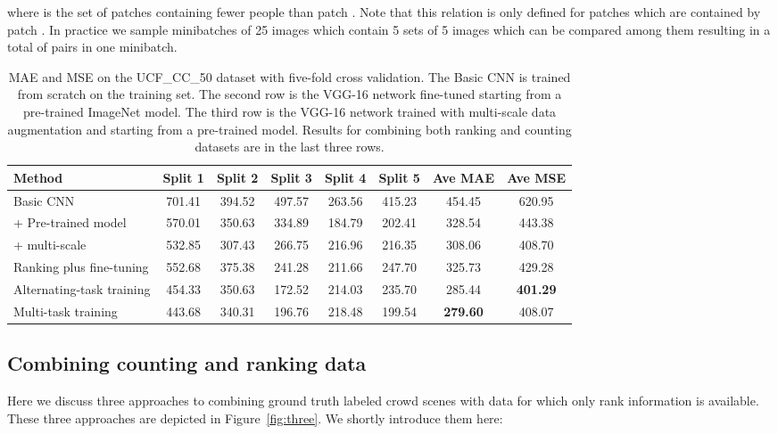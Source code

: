 \documentclass[10pt,twocolumn,letterpaper]{article}
\begin{document}
where  is the set of patches containing fewer people than patch . Note that this relation is only defined for patches which are contained by patch . In practice we sample minibatches of 25 images which contain 5 sets of 5 images which can be compared among them resulting in a total of  pairs in one minibatch.

\begin{table*}
\centering
\begin{tabular}{lccccc|c|c}
\hline
\textbf{Method}          & \textbf{Split 1} & \textbf{Split 2} & \textbf{Split 3} & \textbf{Split 4} & \textbf{Split 5} & \textbf{Ave MAE}  & \textbf{Ave MSE}      \\ \hline \hline
Basic CNN       & 701.41 & 394.52 & 497.57 & 263.56 & 415.23 & 454.45 & 620.95  \\
\: + Pre-trained model       & 570.01 & 350.63 & 334.89 & 184.79 & 202.41 & 328.54 & 443.38  \\
\: + multi-scale       & 532.85 & 307.43 & 266.75 & 216.96 & 216.35 & 308.06 & 408.70 \\
 Ranking plus fine-tuning       & 552.68 & 375.38 &  241.28 & 211.66 & 247.70 & 325.73 &429.28 \\
 Alternating-task training & 454.33 & 350.63 & 172.52 & 214.03 &235.70&  285.44 &\textbf{401.29} \\
 Multi-task training & 443.68 & 340.31 & 196.76 & 218.48 & 199.54 & \textbf{279.60 }  &408.07 \\ \hline

\end{tabular}
\caption{MAE and MSE on the UCF\_CC\_50 dataset with five-fold
  cross validation. The Basic CNN is trained from scratch on the
  training set. The second row is the VGG-16 network fine-tuned
  starting from a pre-trained ImageNet model. The third row is the
  VGG-16 network trained with multi-scale data augmentation and starting from a
  pre-trained model. Results for combining both ranking and counting
  datasets are in the last three rows.}
\label{table:ablation}

\end{table*}

\subsection{Combining counting and ranking data}
Here we discuss three approaches to combining ground truth labeled
crowd scenes with data for which only rank information is
available. These three approaches are depicted in
Figure~\ref{fig:three}. We shortly introduce them here:
\end{document}
